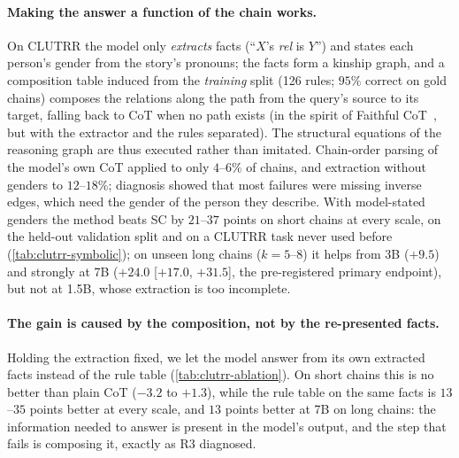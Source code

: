 \documentclass[11pt]{article}
\newcommand{\cddir}{../results/causaldec}
\newcommand{\maybeinput}[1]{\IfFileExists{#1}{}{}}
\begin{document}
\paragraph{Making the answer a function of the chain works.} On CLUTRR the model only
\emph{extracts} facts (``$X$'s \emph{rel} is $Y$'') and states each person's gender from the
story's pronouns; the facts form a kinship graph, and a composition table induced from the
\emph{training} split (126 rules; $95\%$ correct on gold chains) composes the relations along the
path from the query's source to its target, falling back to CoT when no path exists (in the spirit of
Faithful CoT~\citealp{lyu2023faithful}, but with the extractor and the rules separated). The structural
equations of the reasoning graph are thus executed rather than imitated. Chain-order parsing of the
model's own CoT applied to only $4$--$6\%$ of chains, and extraction without genders to
$12$--$18\%$; diagnosis showed that most failures were missing inverse edges, which need the gender
of the person they describe. With model-stated genders the method beats SC by $21$--$37$ points on
short chains at every scale, on the held-out validation split and on a CLUTRR task never used before
(\cref{tab:clutrr-symbolic}); on unseen long chains ($k{=}5$--8) it helps from 3B ($+9.5$) and
strongly at 7B ($+24.0$ [$+17.0$, $+31.5$], the pre-registered primary endpoint), but not at 1.5B,
whose extraction is too incomplete.

\paragraph{The gain is caused by the composition, not by the re-presented facts.} Holding the
extraction fixed, we let the model answer from its own extracted facts instead of the rule table
(\cref{tab:clutrr-ablation}). On short chains this is no better than plain CoT ($-3.2$ to $+1.3$),
while the rule table on the same facts is $13$--$35$ points better at every scale, and $13$ points
better at 7B on long chains: the information needed to answer is present in the model's output, and
the step that fails is composing it, exactly as R3 diagnosed.

\begin{table}[h]
\centering\small
\caption{CLUTRR accuracy. Extract+rules: model-extracted facts and genders, composed by a rule table
induced from the training split; $\Delta$ is Extract+rules SC$_5$ minus the better of CoT and
SC$_{10}$ (compute-matched), with paired bootstrap CI.}
\label{tab:clutrr-symbolic}
\resizebox{\linewidth}{!}{\maybeinput{\cddir/tab_clutrr_symbolic.tex}}
\end{table}
\end{document}
